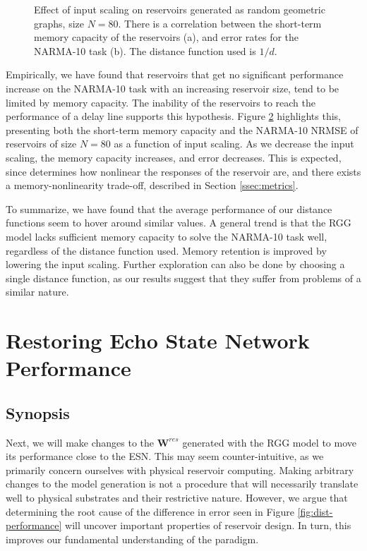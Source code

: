 \begin{figure}[t]
\begin{subfigure}{.49\textwidth}
    \caption{}
    \label{fig:dist-performance-is-b}
  \end{subfigure}
  \caption{
    Effect of input scaling on reservoirs generated as random geometric graphs,
size $N = 80$. There is a correlation between the short-term memory capacity of
the reservoirs (a), and error rates for the NARMA-10 task (b). The distance
function used is $1/d$.
  }
  \label{fig:dist-performance-is}
\end{figure}

Empirically, we have found that reservoirs that get no significant performance
increase on the NARMA-10 task with an increasing reservoir size, tend to be
limited by memory capacity. The inability of the reservoirs to reach the
performance of a delay line supports this hypothesis. Figure
\ref{fig:dist-performance-is} highlights this, presenting both the short-term
memory capacity and the NARMA-10 NRMSE of reservoirs of size $N = 80$ as a
function of input scaling. As we decrease the input scaling, the memory capacity
increases, and error decreases. This is expected, since determines how nonlinear
the responses of the reservoir are, and there exists a memory-nonlinearity
trade-off, described in Section \ref{ssec:metrics}.

To summarize, we have found that the average performance of our distance
functions seem to hover around similar values. A general trend is that the RGG
model lacks sufficient memory capacity to solve the NARMA-10 task well,
regardless of the distance function used. Memory retention is improved by
lowering the input scaling. Further exploration can also be done by choosing a
single distance function, as our results suggest that they suffer from problems
of a similar nature.


\section{Restoring Echo State Network Performance}
\label{sec:restore}

\subsection{Synopsis}

Next, we will make changes to the $\mathbf{W}^{res}$ generated with the RGG
model to move its performance close to the ESN. This may seem counter-intuitive,
as we primarily concern ourselves with physical reservoir computing. Making
arbitrary changes to the model generation is not a procedure that will
necessarily translate well to physical substrates and their restrictive
nature. However, we argue that determining the root cause of the difference in
error seen in Figure \ref{fig:dist-performance} will uncover important
properties of reservoir design. In turn, this improves our fundamental
understanding of the paradigm.

